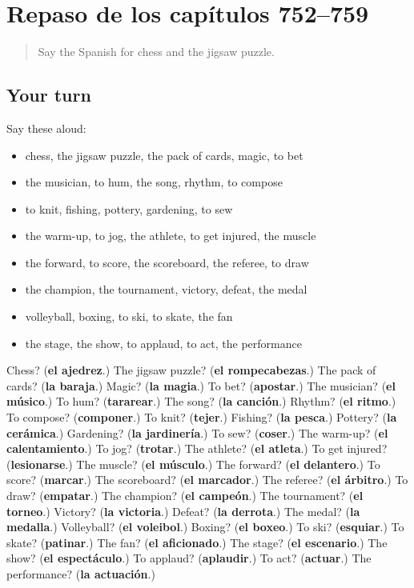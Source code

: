\section[(dialogue)]{Repaso de los capítulos 752–759}

\label{lesson:ES-R759-repaso-752-759}



\begin{quote}
Say the Spanish for chess and the jigsaw puzzle.
\end{quote}

\subsection*{Your turn}
Say these aloud:

\begin{itemize}
\raggedright
  \item chess, the jigsaw puzzle, the pack of cards, magic, to bet
  \item the musician, to hum, the song, rhythm, to compose
  \item to knit, fishing, pottery, gardening, to sew
  \item the warm-up, to jog, the athlete, to get injured, the muscle
  \item the forward, to score, the scoreboard, the referee, to draw
  \item the champion, the tournament, victory, defeat, the medal
  \item volleyball, boxing, to ski, to skate, the fan
  \item the stage, the show, to applaud, to act, the performance
\end{itemize}

\begin{tcolorbox}[breakable,colback=teal!4,colframe=teal!35!black,title={Before you move on}]
Chess? (\textbf{el ajedrez}.) The jigsaw puzzle? (\textbf{el rompecabezas}.) The pack of cards? (\textbf{la baraja}.) Magic? (\textbf{la magia}.) To bet? (\textbf{apostar}.) The musician? (\textbf{el músico}.) To hum? (\textbf{tararear}.) The song? (\textbf{la canción}.) Rhythm? (\textbf{el ritmo}.) To compose? (\textbf{componer}.) To knit? (\textbf{tejer}.) Fishing? (\textbf{la pesca}.) Pottery? (\textbf{la cerámica}.) Gardening? (\textbf{la jardinería}.) To sew? (\textbf{coser}.) The warm-up? (\textbf{el calentamiento}.) To jog? (\textbf{trotar}.) The athlete? (\textbf{el atleta}.) To get injured? (\textbf{lesionarse}.) The muscle? (\textbf{el músculo}.) The forward? (\textbf{el delantero}.) To score? (\textbf{marcar}.) The scoreboard? (\textbf{el marcador}.) The referee? (\textbf{el árbitro}.) To draw? (\textbf{empatar}.) The champion? (\textbf{el campeón}.) The tournament? (\textbf{el torneo}.) Victory? (\textbf{la victoria}.) Defeat? (\textbf{la derrota}.) The medal? (\textbf{la medalla}.) Volleyball? (\textbf{el voleibol}.) Boxing? (\textbf{el boxeo}.) To ski? (\textbf{esquiar}.) To skate? (\textbf{patinar}.) The fan? (\textbf{el aficionado}.) The stage? (\textbf{el escenario}.) The show? (\textbf{el espectáculo}.) To applaud? (\textbf{aplaudir}.) To act? (\textbf{actuar}.) The performance? (\textbf{la actuación}.)
\end{tcolorbox}
